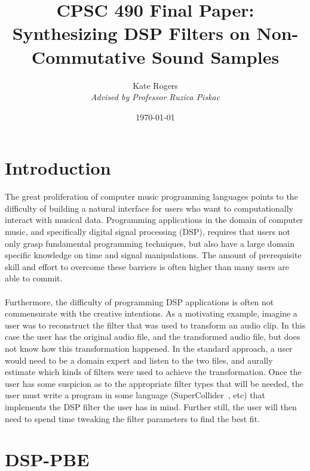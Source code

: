 \documentclass[english, 11pt]{article}
\title{\textbf{CPSC 490 Final Paper: Synthesizing DSP Filters on Non-Commutative Sound Samples}}
\author{Kate Rogers\\ \textit{Advised by Professor Ruzica Piskac}}
\date{\today}
\begin{document}
\maketitle

\section{Introduction}

The great proliferation of computer music programming languages points to the difficulty of building a natural interface for users who want to computationally interact with musical data. Programming applications in the domain of computer music, and specifically digital signal processing (DSP), requires that users not only grasp fundamental programming techniques, but also have a large domain specific knowledge on time and signal manipulations. The amount of prerequisite skill and effort to overcome these barriers is often higher than many users are able to commit.  \\ \\
Furthermore, the difficulty of programming DSP applications is often not commensurate with the creative intentions. As a motivating example, imagine a user was to reconstruct the filter that was used to transform an audio clip. In this case the user has the original audio file, and the transformed audio file, but does not know how this transformation happened. In the standard approach, a user would need to be a domain expert and listen to the two files, and aurally estimate which kinds of filters were used to achieve the transformation. Once the user has some suspicion as to the appropriate filter types that will be needed, the user must write a program in some language (SuperCollider~\cite{supercollider}, etc) that implements the DSP filter the user has in mind. Further still, the user will then need to spend time tweaking the filter parameters to find the best fit. 

\section{DSP-PBE}
\end{document}
